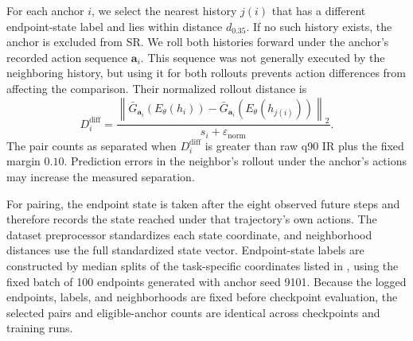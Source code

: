 \documentclass{article}
\begin{document}
For each anchor $i$, we select the nearest history $j(i)$ that has a different
endpoint-state label and lies within distance $d_{0.35}$. If no such history
exists, the anchor is excluded from SR. We roll both histories forward under
the anchor's recorded action sequence $\mathbf a_i$. This sequence was not
generally executed by the neighboring history, but using it for both rollouts
prevents action differences from affecting the comparison. Their normalized
rollout distance is
\begin{equation}
D_i^{\mathrm{diff}}
=
\frac{
\left\|\bar G_{\mathbf a_i}(E_\theta(h_i))
-\bar G_{\mathbf a_i}(E_\theta(h_{j(i)}))\right\|_2
}{s_i+\varepsilon_{\mathrm{norm}}}.
\end{equation}
The pair counts as separated when $D_i^{\mathrm{diff}}$ is greater than raw
q90 IR plus the fixed margin $0.10$.
Prediction errors in the neighbor's rollout under the anchor's actions may
increase the measured separation.

For pairing, the endpoint state is taken after the eight observed future steps
and therefore records the state reached under that trajectory's own actions.
The dataset preprocessor standardizes each state coordinate, and neighborhood
distances use the full standardized state vector. Endpoint-state labels are
constructed by median splits of the task-specific coordinates listed in
, using the fixed batch of 100 endpoints generated with
anchor seed 9101. Because the logged endpoints, labels, and neighborhoods are
fixed before checkpoint evaluation, the selected pairs and eligible-anchor
counts are identical across checkpoints and training runs.
\end{document}
